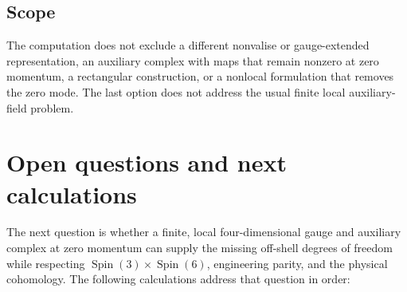 \documentclass[11pt]{article}
\begin{document}
\subsection{Scope}

The computation does not exclude a different nonvalise or gauge-extended
representation, an auxiliary complex with maps that remain nonzero at zero
momentum, a
rectangular construction, or a nonlocal formulation that removes the zero
mode.  The last option does not address the usual finite local auxiliary-field
problem.

\section{Open questions and next calculations}

The next question is whether a finite, local four-dimensional gauge and
auxiliary complex at zero momentum can supply the missing off-shell degrees of
freedom while respecting
$\operatorname{Spin}(3)\times\operatorname{Spin}(6)$, engineering parity, and
the physical cohomology.  The following calculations address that question in
order:
\end{document}
